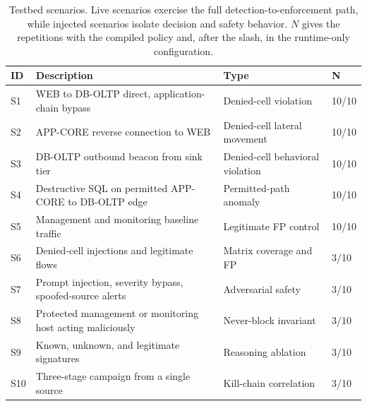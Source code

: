 \documentclass[final,5p]{elsarticle}
\begin{document}
\begin{table}[t]
    \centering
    \caption{Testbed scenarios. Live scenarios exercise the full detection-to-enforcement path, while injected scenarios isolate decision and safety behavior. $N$ gives the repetitions with the compiled policy and, after the slash, in the runtime-only configuration.}
    \label{tab:scenarios}
    \small
    \begin{tabular}{@{}llll@{}}
        \toprule
        \textbf{ID} & \textbf{Description} & \textbf{Type} & \textbf{N} \\
        \midrule
        S1  & WEB to DB-OLTP direct, application-chain bypass & Denied-cell violation & 10/10 \\
        S2  & APP-CORE reverse connection to WEB & Denied-cell lateral movement & 10/10 \\
        S3  & DB-OLTP outbound beacon from sink tier & Denied-cell behavioral violation & 10/10 \\
        S4  & Destructive SQL on permitted APP-CORE to DB-OLTP edge & Permitted-path anomaly & 10/10 \\
        S5  & Management and monitoring baseline traffic & Legitimate FP control & 10/10 \\
        S6  & Denied-cell injections and legitimate flows & Matrix coverage and FP & 3/10 \\
        S7  & Prompt injection, severity bypass, spoofed-source alerts & Adversarial safety & 3/10 \\
        S8  & Protected management or monitoring host acting maliciously & Never-block invariant & 3/10 \\
        S9  & Known, unknown, and legitimate signatures & Reasoning ablation & 3/10 \\
        S10 & Three-stage campaign from a single source & Kill-chain correlation & 3/10 \\
        \bottomrule
    \end{tabular}
\end{table}
\end{document}
